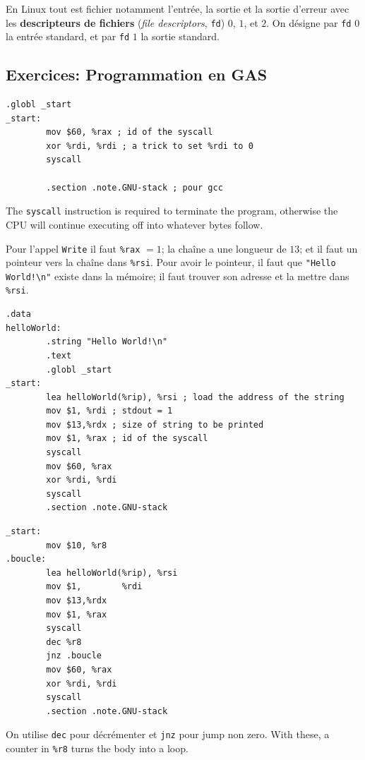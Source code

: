 \begin{remark}
  En Linux tout est fichier notamment l'entrée, la sortie et la sortie d'erreur
  avec les \textbf{descripteurs de fichiers} (\textit{file descriptors},
  \verb|fd|) $0$, $1$, et $2$. On désigne par \verb|fd| $0$ la entrée standard,
  et par \verb|fd| $1$ la sortie standard.
\end{remark}

\subsection{Exercices: Programmation en GAS}

\begin{problem}
\begin{lstlisting}[language=gas]
        .globl _start
_start:
        mov $60, %rax ; id of the syscall
        xor %rdi, %rdi ; a trick to set %rdi to 0
        syscall

        .section .note.GNU-stack ; pour gcc
\end{lstlisting}
\end{problem}

\begin{remark}
  The \verb|syscall| instruction is required to terminate the program,
  otherwise the CPU will continue executing off into whatever bytes follow.
\end{remark}

\begin{problem}
  Pour l'appel \verb|Write| il faut \verb|%rax| $= 1$; la chaîne a une longueur
  de $13$; et il faut un pointeur vers la chaîne dans \verb|%rsi|.  Pour avoir
  le pointeur, il faut que \verb|"Hello World!\n"| existe dans la mémoire; il
  faut trouver son adresse et la mettre dans \verb|%rsi|.
\begin{lstlisting}[language=gas]
        .data
helloWorld:
        .string "Hello World!\n"
        .text
        .globl _start
_start:
        lea helloWorld(%rip), %rsi ; load the address of the string
        mov $1, %rdi ; stdout = 1
        mov $13,%rdx ; size of string to be printed
        mov $1, %rax ; id of the syscall
        syscall
        mov $60, %rax
        xor %rdi, %rdi
        syscall
        .section .note.GNU-stack
\end{lstlisting}
\end{problem}

\begin{problem}
\begin{lstlisting}[language=gas]
_start:
        mov $10, %r8
.boucle:
        lea helloWorld(%rip), %rsi
        mov $1,        %rdi
        mov $13,%rdx
        mov $1, %rax
        syscall
        dec %r8
        jnz .boucle
        mov $60, %rax
        xor %rdi, %rdi
        syscall
        .section .note.GNU-stack
\end{lstlisting}
  On utilise \verb|dec| pour décrémenter et \verb|jnz| pour jump non zero. With
  these, a counter in \verb|%r8| turns the body into a loop.
\end{problem}

